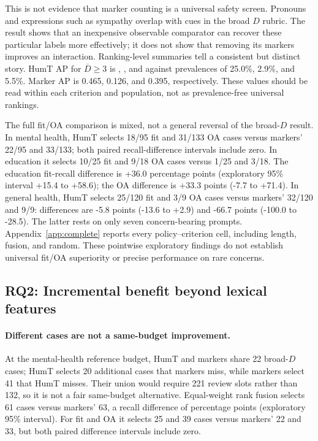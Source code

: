 \documentclass[manuscript,screen,review,anonymous]{acmart}
\newcommand{\Dcrit}{\ensuremath{\overline{D}\geq 3}}
\begin{document}
This is not evidence that marker counting is a universal safety screen. Pronouns and expressions such as sympathy overlap with cues in the broad $D$ rubric. The result shows that an inexpensive observable comparator can recover these particular labels more effectively; it does not show that removing its markers improves an interaction. Ranking-level summaries tell a consistent but distinct story. HumT AP for \Dcrit{} is \MHAP{}, \EDAP{}, and \GHAP{} against prevalences of 25.0\%, 2.9\%, and 5.5\%. Marker AP is 0.465, 0.126, and 0.395, respectively. These values should be read within each criterion and population, not as prevalence-free universal rankings.

The full fit/OA comparison is mixed, not a general reversal of the broad-$D$ result. In mental health, HumT selects 18/95 fit and 31/133 OA cases versus markers' 22/95 and 33/133; both paired recall-difference intervals include zero. In education it selects 10/25 fit and 9/18 OA cases versus 1/25 and 3/18. The education fit-recall difference is +36.0 percentage points (exploratory 95\% interval +15.4 to +58.6); the OA difference is +33.3 points (-7.7 to +71.4). In general health, HumT selects 25/120 fit and 3/9 OA cases versus markers' 32/120 and 9/9: differences are -5.8 points (-13.6 to +2.9) and -66.7 points (-100.0 to -28.5). The latter rests on only seven concern-bearing prompts. Appendix~\ref{app:complete} reports every policy--criterion cell, including length, fusion, and random. These pointwise exploratory findings do not establish universal fit/OA superiority or precise performance on rare concerns.

\subsection{RQ2: Incremental benefit beyond lexical features}
\paragraph{Different cases are not a same-budget improvement.}
At the mental-health reference budget, HumT and markers share 22 broad-$D$ cases; HumT selects 20 additional cases that markers miss, while markers select 41 that HumT misses. Their union would require 221 review slots rather than 132, so it is not a fair same-budget alternative. Equal-weight rank fusion selects 61 cases versus markers' 63, a recall difference of \MHFusionDelta{} percentage points (exploratory 95\% interval). For fit and OA it selects 25 and 39 cases versus markers' 22 and 33, but both paired difference intervals include zero.
\end{document}
